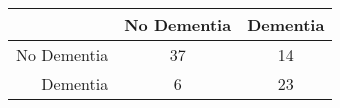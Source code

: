 \begin{table}[ht]
\centering
\begin{tabular}{r|c|c}
  \hline
 & No Dementia & Dementia \\ 
  \hline
No Dementia & 37 & 14 \\ 
  Dementia & 6 & 23 \\ 
   \hline
\end{tabular}
\end{table}
